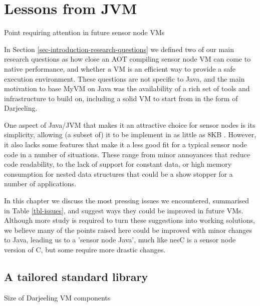 \chapter{Lessons from JVM}
\begin{table}
    \centering
    \caption{Point requiring attention in future sensor node VMs}
    \scriptsize
    \label{tbl-issues}
    
\end{table}

\label{sec-lessons-from-jvm}

In Section \ref{sec-introduction-research-questions} we defined two of our main research questions as how close an AOT compiling sensor node VM can come to native performance, and whether a VM is an efficient way to provide a safe execution environment. These questions are not specific to Java, and the main motivation to base MyVM on Java was the availability of a rich set of tools and infrastructure to build on, including a solid VM to start from in the form of Darjeeling.

One aspect of Java/JVM that makes it an attractive choice for sensor nodes is its simplicity, allowing (a subset of) it to be implement in as little as 8KB \cite{Harbaum}. However, it also lacks some features that make it a less good fit for a typical sensor node code in a number of situations. These range from minor annoyances that reduce code readability, to the lack of support for constant data, or high memory consumption for nested data structures that could be a show stopper for a number of applications.

In this chapter we discuss the most pressing issues we encountered, summarised in Table \ref{tbl-issues}, and suggest ways they could be improved in future VMs. Although more study is required to turn these suggestions into working solutions, we believe many of the points raised here could be improved with minor changes to Java, leading us to a 'sensor node Java', much like nesC \cite{Gay:2003up} is a sensor node version of C, but some require more drastic changes.

\section{A tailored standard library}
\label{sec-std-lib}
\begin{table}
    \centering
    \caption{Size of Darjeeling VM components}
    \scriptsize
    \label{tab-vm-size}
     
\end{table}

